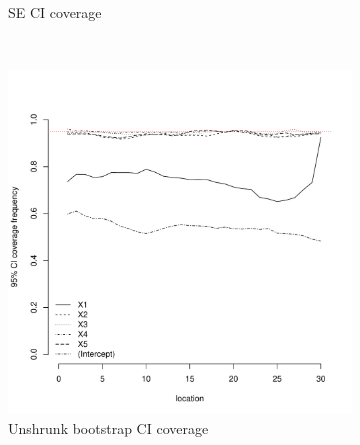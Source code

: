 \documentclass[authoryear, review, 11pt]{elsarticle}
\begin{document}
\begin{figure}
\begin{subfigure}[b]{0.45\textwidth}
		\caption{SE CI coverage}
	\end{subfigure}%
	\\%
	\begin{subfigure}[b]{0.45\textwidth}
	\centering
		\includegraphics[width=\textwidth]{../../figures/simulation/15.4.profile_unshrunk_bootstrap_coverage.pdf}
		\caption{Unshrunk bootstrap CI coverage}
	\end{subfigure}%
	~ %
	\begin{subfigure}[b]{0.45\textwidth}
	\centering

\end{subfigure}
\end{figure}
\end{document}
